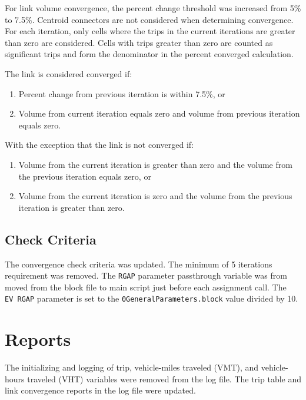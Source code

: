 \documentclass[
  letterpaper,
  DIV=11,
  numbers=noendperiod]{scrreprt}
\providecommand{\tightlist}{%
  \setlength{\itemsep}{0pt}\setlength{\parskip}{0pt}}\usepackage{longtable,booktabs,array}
\begin{document}
For link volume convergence, the percent change threshold was increased
from 5\% to 7.5\%. Centroid connectors are not considered when
determining convergence. For each iteration, only cells where the trips
in the current iterations are greater than zero are considered. Cells
with trips greater than zero are counted as significant trips and form
the denominator in the percent converged calculation.

The link is considered converged if:

\begin{enumerate}
\def\labelenumi{\arabic{enumi}.}
\tightlist
\item
  Percent change from previous iteration is within 7.5\%, or
\item
  Volume from current iteration equals zero and volume from previous
  iteration equals zero.
\end{enumerate}

With the exception that the link is not converged if:

\begin{enumerate}
\def\labelenumi{\arabic{enumi}.}
\tightlist
\item
  Volume from the current iteration is greater than zero and the volume
  from the previous iteration equals zero, or
\item
  Volume from the current iteration is zero and the volume from the
  previous iteration is greater than zero.
\end{enumerate}

\hypertarget{check-criteria}{%
\subsection{Check Criteria}\label{check-criteria}}

The convergence check criteria was updated. The minimum of 5 iterations
requirement was removed. The \texttt{RGAP} parameter passthrough
variable was from moved from the block file to main script just before
each assignment call. The \texttt{EV\ RGAP} parameter is set to the
\texttt{0GeneralParameters.block} value divided by 10.

\hypertarget{reports}{%
\section{Reports}\label{reports}}

The initializing and logging of trip, vehicle-miles traveled (VMT), and
vehicle-hours traveled (VHT) variables were removed from the log file.
The trip table and link convergence reports in the log file were
updated.
\end{document}
